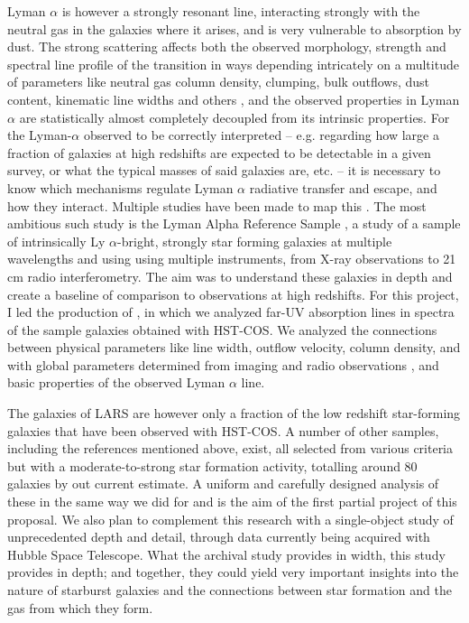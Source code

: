 \documentclass[12pt, a4paper]{scrartcl}
\begin{document}
Lyman $\alpha$ is however a  strongly resonant line, interacting strongly with
the neutral gas in the galaxies where it arises, and is very vulnerable to
absorption by dust. The strong scattering affects both the observed morphology,
strength and spectral line profile of the transition in ways depending
intricately on a multitude of parameters like neutral gas column density,
clumping, bulk outflows, dust content, kinematic line widths and others
\citep[e.g.][]{Wofford2013,Atek2008,Atek2009,RiveraThorsen2015,Kunth1998,
Giavalisco1996,LARSI, LARSII}, and the observed properties in Lyman $\alpha$ are
statistically almost completely decoupled from its intrinsic properties. For the
Lyman-$\alpha$ observed to be correctly interpreted -- e.g. regarding how large
a fraction of galaxies at high redshifts are expected to be detectable in a
given survey, or what the typical masses of said galaxies are, etc. -- it is
necessary to know which mechanisms regulate Lyman $\alpha$ radiative transfer
and escape, and how they interact. Multiple studies have been made to map this
\citep[e.g][]{Atek2008,Atek2009,Hayes2005,Hayes2007,Hayes2009,Ostlin2009,Kunth1998}.
The most ambitious such study is the Lyman Alpha Reference Sample
\citep[LARS, ][]{LARS0,LARSI,LARSII}, a study of a sample of intrinsically Ly
$\alpha$-bright, strongly star forming galaxies at multiple wavelengths and
using using multiple instruments, from X-ray observations to 21 cm radio
interferometry. The aim was to understand these galaxies in depth and create a
baseline of comparison to observations at high redshifts. For this project, I
led the production of \cite{RiveraThorsen2015}, in which we analyzed far-UV
absorption lines in spectra of the sample galaxies obtained with HST-COS. We
analyzed the connections between physical parameters like line width, outflow
velocity, column density, and with global parameters determined from imaging
\citep{LARSII} and radio observations \citep{LARSIII}, and basic properties of
the observed Lyman $\alpha$ line. 

The galaxies of LARS are however only a fraction of the low redshift
star-forming galaxies that have been observed with HST-COS. A number of other
samples, including the references mentioned above, exist, all selected from
various criteria but with a moderate-to-strong star formation activity,
totalling around 80 galaxies by out current estimate. A uniform and carefully
designed analysis of these in the same way we did for \cite{RiveraThorsen2015}
and \cite{RiveraThorsen2017} is the aim of the first partial project of this
proposal. We also plan to complement this research with a single-object study of
unprecedented depth and detail, through data currently being acquired with
Hubble Space Telescope. What the archival study provides in width, this study
provides in depth; and together, they could yield very important insights into
the nature of starburst galaxies and the connections between star formation and
the gas from which they form.
\end{document}
